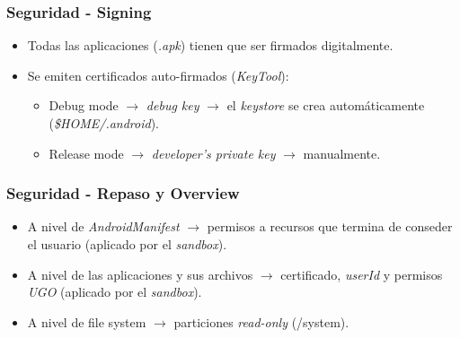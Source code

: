 \begin{frame}
  \frametitle{Seguridad - Signing}
  \begin{itemize}
    \item Todas las aplicaciones (\textit{.apk}) tienen que ser firmados digitalmente.

    \item Se emiten certificados auto-firmados (\textit{KeyTool}):
    \begin{itemize}
	\item Debug mode $\rightarrow$ \textit{debug key} $\rightarrow$ el \textit{keystore} se crea automáticamente (\textit{\$HOME/.android}).
	
	\item Release mode $\rightarrow$ \textit{developer's private key} $\rightarrow$ manualmente.
    \end{itemize}    
  \end{itemize}
\end{frame}

\begin{frame}
  \frametitle{Seguridad - Repaso y Overview}
  \begin{itemize}
   \item A nivel de \textit{AndroidManifest} $\rightarrow$ permisos a recursos que termina de conseder el usuario (aplicado por el \textit{sandbox}).
   
   \item A nivel de las aplicaciones y sus archivos $\rightarrow$ certificado, \textit{userId} y permisos \textit{UGO} (aplicado por el \textit{sandbox}).
   
   \item A nivel de file system $\rightarrow$ particiones \textit{read-only} (/system).   
  \end{itemize}
\end{frame}

